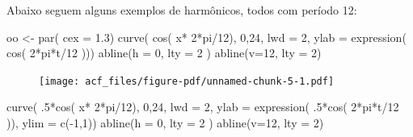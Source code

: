 \documentclass[
  letterpaper,
  DIV=11,
  numbers=noendperiod]{scrreprt}
\newenvironment{Shaded}{\begin{snugshade}}{\end{snugshade}}
\newcommand{\AttributeTok}[1]{\textcolor[rgb]{0.40,0.45,0.13}{#1}}
\newcommand{\DecValTok}[1]{\textcolor[rgb]{0.68,0.00,0.00}{#1}}
\newcommand{\FloatTok}[1]{\textcolor[rgb]{0.68,0.00,0.00}{#1}}
\newcommand{\FunctionTok}[1]{\textcolor[rgb]{0.28,0.35,0.67}{#1}}
\newcommand{\NormalTok}[1]{\textcolor[rgb]{0.00,0.23,0.31}{#1}}
\newcommand{\OtherTok}[1]{\textcolor[rgb]{0.00,0.23,0.31}{#1}}
\newcommand{\SpecialCharTok}[1]{\textcolor[rgb]{0.37,0.37,0.37}{#1}}
\begin{document}
Abaixo seguem alguns exemplos de harmônicos, todos com período 12:

\begin{Shaded}
\begin{Highlighting}[]
\NormalTok{oo }\OtherTok{\textless{}{-}} \FunctionTok{par}\NormalTok{( }\AttributeTok{cex =} \FloatTok{1.3}\NormalTok{)}
\FunctionTok{curve}\NormalTok{( }\FunctionTok{cos}\NormalTok{( x}\SpecialCharTok{*} \DecValTok{2}\SpecialCharTok{*}\NormalTok{pi}\SpecialCharTok{/}\DecValTok{12}\NormalTok{), }\DecValTok{0}\NormalTok{,}\DecValTok{24}\NormalTok{, }\AttributeTok{lwd =} \DecValTok{2}\NormalTok{, }\AttributeTok{ylab =} \FunctionTok{expression}\NormalTok{( }\FunctionTok{cos}\NormalTok{( }\DecValTok{2}\SpecialCharTok{*}\NormalTok{pi}\SpecialCharTok{*}\NormalTok{t}\SpecialCharTok{/}\DecValTok{12}\NormalTok{ )))}
\FunctionTok{abline}\NormalTok{(}\AttributeTok{h =} \DecValTok{0}\NormalTok{, }\AttributeTok{lty =} \DecValTok{2}\NormalTok{ )}
\FunctionTok{abline}\NormalTok{(}\AttributeTok{v=}\DecValTok{12}\NormalTok{, }\AttributeTok{lty =} \DecValTok{2}\NormalTok{)}
\end{Highlighting}
\end{Shaded}

\begin{figure}[H]

{\centering \texttt{[image: acf\_files/figure-pdf/unnamed-chunk-5-1.pdf]}

}

\end{figure}

\begin{Shaded}
\begin{Highlighting}[]
\FunctionTok{curve}\NormalTok{( .}\DecValTok{5}\SpecialCharTok{*}\FunctionTok{cos}\NormalTok{( x}\SpecialCharTok{*} \DecValTok{2}\SpecialCharTok{*}\NormalTok{pi}\SpecialCharTok{/}\DecValTok{12}\NormalTok{), }\DecValTok{0}\NormalTok{,}\DecValTok{24}\NormalTok{, }\AttributeTok{lwd =} \DecValTok{2}\NormalTok{, }\AttributeTok{ylab =} \FunctionTok{expression}\NormalTok{( .}\DecValTok{5}\SpecialCharTok{*}\FunctionTok{cos}\NormalTok{( }\DecValTok{2}\SpecialCharTok{*}\NormalTok{pi}\SpecialCharTok{*}\NormalTok{t}\SpecialCharTok{/}\DecValTok{12}\NormalTok{ )), }\AttributeTok{ylim =} \FunctionTok{c}\NormalTok{(}\SpecialCharTok{{-}}\DecValTok{1}\NormalTok{,}\DecValTok{1}\NormalTok{))}
\FunctionTok{abline}\NormalTok{(}\AttributeTok{h =} \DecValTok{0}\NormalTok{, }\AttributeTok{lty =} \DecValTok{2}\NormalTok{ )}
\FunctionTok{abline}\NormalTok{(}\AttributeTok{v=}\DecValTok{12}\NormalTok{, }\AttributeTok{lty =} \DecValTok{2}\NormalTok{)}
\end{Highlighting}
\end{Shaded}
\end{document}
